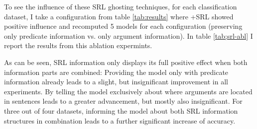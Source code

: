 {To see the influence of these SRL ghosting techniques, for each classification dataset, I take a
configuration from table \ref{tab:results} where +SRL showed positive influence and recomputed 5
models for each configuration (preserving only predicate information vs. only argument information).
In table \ref{tab;srl-abl} I report the results from this ablation expermints.




As can be seen, SRL information only displays its full positive effect when both information parts are combined: Providing
the model only with predicate information already leads to a slight, but insignificant improvement in all experiments.
By telling the model exclusively about where arguments are located in sentences leads to a greater advancement, but
mostly also insignificant. For three out of four datasets, informing the model about both SRL information structures
in combination leads to a further significant increase of accuracy.

}
